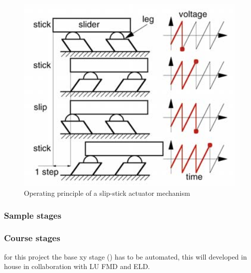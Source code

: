 \documentclass[10pt]{article}
\begin{document}
\begin{figure}[H]
  \centering
  \begin{minipage}[b]{0.45\textwidth}
  \end{minipage}
  \hfill
  \begin{minipage}[b]{0.45\textwidth}
    \includegraphics[width=1\textwidth]{img/sample_holder_and_mask/Stick-slip-piezo-actuator-operation-principle.png}
    \caption{Operating principle of a slip-stick actuator mechanism 
    \cite{mazerollePositioningHandlingMeasuring2003}}
    \label{fig:slip_stick_principle}
  \end{minipage}
\end{figure}

\subsubsection{Sample stages}

\subsubsection{Course stages}

for this project the base xy stage () has to be automated, this will developed in house in collaboration with LU FMD and ELD. 
\end{document}
